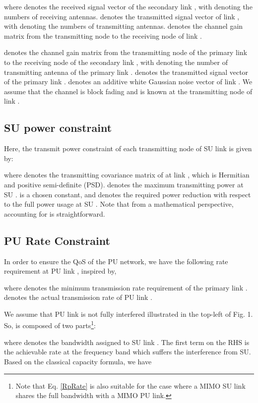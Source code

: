 \documentclass[12pt,onecolumn,tworows]{IEEEtran}
\begin{document}
where  denotes the received signal vector of the secondary link , with  denoting the numbers of receiving antennas.  denotes the transmitted signal vector of  link , with  denoting the numbers of transmitting antennas.
 denotes the channel gain matrix from the transmitting node to the receiving node of link .

denotes the channel gain matrix from the transmitting node of the primary link  to the receiving node of the secondary link , with  denoting the number of transmitting antenna of the primary link .
 denotes the transmitted signal vector of the primary link .  denotes an additive white Gaussian noise vector of link . We assume that the channel is block fading and  is known at the transmitting node of link .


\subsection{SU power constraint}

Here, the transmit power constraint of each transmitting node  of SU link is given by:

where  denotes the transmitting covariance matrix of  at link , which is Hermitian and positive semi-definite (PSD).
 denotes the maximum transmitting power  at SU .
  is a chosen constant, and denotes the required power reduction with respect to the full power usage at SU .  Note that from a mathematical perspective, accounting for  is straightforward.

\subsection{PU Rate Constraint}

In order to ensure the QoS of the PU network, we have the following rate requirement at PU link , inspired by\cite{RuiZhangICL2012},

where  denotes the minimum transmission rate requirement of the primary link .
 denotes the actual transmission rate of PU link .

We assume that PU link is not fully interfered illustrated in the top-left of Fig. 1.
So,   is composed of two parts\footnote{Note that Eq. \eqref{RpRate} is also suitable for the case where a MIMO SU link shares the full bandwidth with a MIMO PU link.}:

where  denotes the bandwidth assigned to SU link .
The first term on the RHS is the achievable rate at the frequency band which suffers the interference from SU. Based on the classical capacity formula, we have
\end{document}
